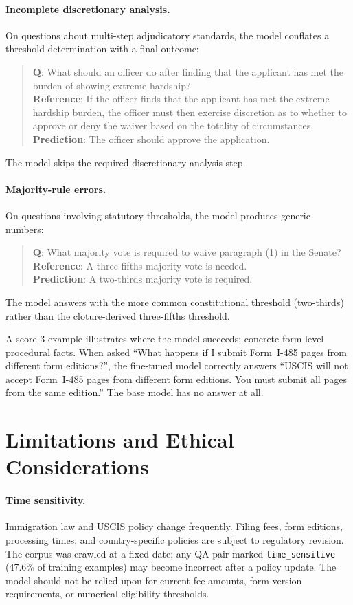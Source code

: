 \documentclass[11pt]{article}
\begin{document}
\paragraph{Incomplete discretionary analysis.} On questions about multi-step adjudicatory standards, the model conflates a threshold determination with a final outcome:
\begin{quote}
\textbf{Q}: What should an officer do after finding that the applicant has met the burden of showing extreme hardship?\\
\textbf{Reference}: If the officer finds that the applicant has met the extreme hardship burden, the officer must then exercise discretion as to whether to approve or deny the waiver based on the totality of circumstances.\\
\textbf{Prediction}: The officer should approve the application.
\end{quote}
The model skips the required discretionary analysis step.

\paragraph{Majority-rule errors.} On questions involving statutory thresholds, the model produces generic numbers:
\begin{quote}
\textbf{Q}: What majority vote is required to waive paragraph (1) in the Senate?\\
\textbf{Reference}: A three-fifths majority vote is needed.\\
\textbf{Prediction}: A two-thirds majority vote is required.
\end{quote}
The model answers with the more common constitutional threshold (two-thirds) rather than the cloture-derived three-fifths threshold.

A score-3 example illustrates where the model succeeds: concrete form-level procedural facts. When asked ``What happens if I submit Form~I-485 pages from different form editions?'', the fine-tuned model correctly answers ``USCIS will not accept Form~I-485 pages from different form editions. You must submit all pages from the same edition.'' The base model has no answer at all.

\section{Limitations and Ethical Considerations}
\label{sec:limitations}

\paragraph{Time sensitivity.} Immigration law and USCIS policy change frequently. Filing fees, form editions, processing times, and country-specific policies are subject to regulatory revision. The corpus was crawled at a fixed date; any QA pair marked \texttt{time\_sensitive} (47.6\% of training examples) may become incorrect after a policy update. The model should not be relied upon for current fee amounts, form version requirements, or numerical eligibility thresholds.
\end{document}
